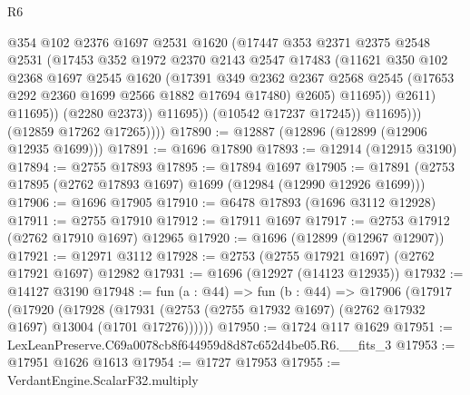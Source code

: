 \begin{lexlean}{R6}
\begin{coremodule}
                            @354
                            @102
                            @2376
                            @1697
                            @2531
                            @1620
                            (@17447
                              @353
                              @2371
                              @2375
                              @2548
                              @2531
                              (@17453
                                @352
                                @1972
                                @2370
                                @2143
                                @2547
                                @17483
                                (@11621
                                  @350
                                  @102
                                  @2368
                                  @1697
                                  @2545
                                  @1620
                                  (@17391
                                    @349
                                    @2362
                                    @2367
                                    @2568
                                    @2545
                                    (@17653 @292 @2360 @1699 @2566 @1882 @17694 @17480)
                                    @2605)
                                  @11695))
                              @2611)
                            @11695))
                        (@2280 @2373))
                      @11695))
                  (@10542 @17237 @17245))
                @11695)))
          (@12859 @17262 @17265))))
@17890 := @12887 (@12896 (@12899 (@12906 @12935 @1699)))
@17891 := @1696 @17890
@17893 := @12914 (@12915 @3190)
@17894 := @2755 @17893
@17895 := @17894 @1697
@17905 := @17891 (@2753 @17895 (@2762 @17893 @1697) @1699 (@12984 (@12990 @12926 @1699)))
@17906 := @1696 @17905
@17910 := @6478 @17893 (@1696 @3112 @12928)
@17911 := @2755 @17910
@17912 := @17911 @1697
@17917 := @2753 @17912 (@2762 @17910 @1697) @12965
@17920 := @1696 (@12899 (@12967 @12907))
@17921 := @12971 @3112
@17928 := @2753 (@2755 @17921 @1697) (@2762 @17921 @1697) @12982
@17931 := @1696 (@12927 (@14123 @12935))
@17932 := @14127 @3190
@17948 := fun (a : @44) =>
  fun (b : @44) =>
  @17906
    (@17917
      (@17920
        (@17928 (@17931 (@2753 (@2755 @17932 @1697) (@2762 @17932 @1697) @13004 (@1701 @17276))))))
@17950 := @1724 @117 @1629
@17951 := LexLeanPreserve.C69a0078cb8f644959d8d87c652d4be05.R6.__fits_3
@17953 := @17951 @1626 @1613
@17954 := @1727 @17953
@17955 := VerdantEngine.ScalarF32.multiply

\end{coremodule}
\end{lexlean}
